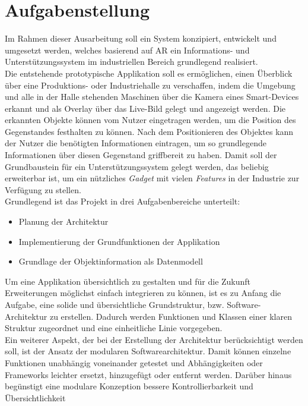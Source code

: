 \section{Aufgabenstellung}
\label{chap:Aufgabenstellung}          %
Im Rahmen dieser Ausarbeitung soll ein System konzipiert, entwickelt und umgesetzt werden, welches basierend auf \acl{AR} ein 
Informations- und Unterstützungssystem im industriellen Bereich grundlegend realisiert.
\\
Die entstehende prototypische Applikation soll es ermöglichen, einen Überblick über eine Produktions- oder Industriehalle zu 
verschaffen, indem die Umgebung und alle in der Halle stehenden Maschinen über die Kamera eines Smart-Devices erkannt und als 
Overlay über das Live-Bild gelegt und angezeigt werden. Die erkannten Objekte können vom Nutzer eingetragen werden, um die Position des 
Gegenstandes festhalten zu können. Nach dem Positionieren des Objektes kann der Nutzer die benötigten Informationen eintragen, um so %
grundlegende Informationen über diesen Gegenstand griffbereit zu haben. Damit soll der Grundbaustein für ein 
Unterstützungssystem gelegt werden, das beliebig erweiterbar ist, um ein nützliches \textit{Gadget} mit vielen \textit{Features} 
in der Industrie zur Verfügung zu stellen.
\\ 
\linebreak
Grundlegend ist das Projekt in drei Aufgabenbereiche unterteilt:
\begin{itemize}
    \item Planung der Architektur
    \item Implementierung der Grundfunktionen der Applikation
    \item Grundlage der Objektinformation als Datenmodell 
\end{itemize}
Um eine Applikation übersichtlich zu gestalten und für die Zukunft Erweiterungen 
möglichst einfach integrieren zu können, ist es zu Anfang die Aufgabe, eine solide und übersichtliche Grundstruktur, bzw. Software-
Architektur zu erstellen. Dadurch werden Funktionen und Klassen einer klaren Struktur zugeordnet und eine einheitliche Linie vorgegeben. 
\\
Ein weiterer Aspekt, der bei der Erstellung der Architektur berücksichtigt werden soll, ist der Ansatz der modularen 
Softwarearchitektur. Damit können einzelne Funktionen unabhängig voneinander getestet und Abhängigkeiten oder Frameworks leichter 
ersetzt, hinzugefügt oder entfernt werden. Darüber hinaus begünstigt eine modulare Konzeption bessere Kontrollierbarkeit und Übersichtlichkeit 
